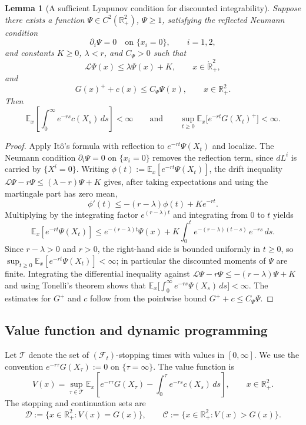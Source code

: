 \documentclass[pdflatex,sn-mathphys-num]{sn-jnl}
\theoremstyle{plain}
\newtheorem{lemma}[theorem]{Lemma}
\theoremstyle{definition}
\newcommand{\R}{\mathbb{R}}
\newcommand{\interior}[1]{\mathring{#1}}
\begin{document}
\begin{lemma}[A sufficient Lyapunov condition for discounted integrability]
\label{lem:lyapunov-integrability}
Suppose there exists a function $\Psi\in C^2(\R^2_+)$, $\Psi\ge1$, satisfying
the reflected Neumann condition
\[
   \partial_i\Psi=0
   \quad\text{on }\{x_i=0\},
   \qquad i=1,2,
\]
and constants $K\ge0$, $\lambda<r$, and $C_\Psi>0$ such that
\[
   \mathcal L\Psi(x)\le \lambda\Psi(x)+K,
   \qquad x\in\interior{\R}^2_+,
\]
and
\[
   G(x)^+ + c(x)\le C_\Psi\Psi(x),
   \qquad x\in\R^2_+.
\]
Then
\[
   \mathbb E_x\left[
      \int_0^\infty e^{-rs}c(X_s)\,ds
   \right]<\infty
   \qquad\text{and}\qquad
   \sup_{t\ge0}
   \mathbb E_x\big[e^{-rt}G(X_t)^+\big]<\infty.
\]
\end{lemma}

\begin{proof}
Apply It\^o's formula with reflection to $e^{-rt}\Psi(X_t)$ and localize. The
Neumann condition $\partial_i\Psi=0$ on $\{x_i=0\}$ removes the reflection
term, since $dL^i$ is carried by $\{X^i=0\}$. Writing
$\phi(t):=\mathbb E_x[e^{-rt}\Psi(X_t)]$, the drift inequality
$\mathcal L\Psi-r\Psi\le(\lambda-r)\Psi+K$ gives, after taking expectations
and using the martingale part has zero mean,
\[
   \phi'(t)\le-(r-\lambda)\phi(t)+K e^{-rt}.
\]
Multiplying by the integrating factor $e^{(r-\lambda)t}$ and integrating from
$0$ to $t$ yields
\[
   \mathbb E_x[e^{-rt}\Psi(X_t)]
   \le
   e^{-(r-\lambda)t}\Psi(x)
   +
   K\int_0^t e^{-(r-\lambda)(t-s)}\,e^{-rs}\,ds .
\]
Since $r-\lambda>0$ and $r>0$, the right-hand side is bounded uniformly in
$t\ge0$, so $\sup_{t\ge0}\mathbb E_x[e^{-rt}\Psi(X_t)]<\infty$; in particular
the discounted moments of $\Psi$ are finite. Integrating the differential
inequality against $\mathcal L\Psi-r\Psi\le-(r-\lambda)\Psi+K$ and using
Tonelli's theorem shows that
$\mathbb E_x\big[\int_0^\infty e^{-rs}\Psi(X_s)\,ds\big]<\infty$. The estimates
for $G^+$ and $c$ follow from the pointwise bound $G^++c\le C_\Psi\Psi$.
\end{proof}

\subsection{Value function and dynamic programming}
\label{sec:value-dpp}
Let $\mathcal T$ denote the set of $(\mathcal F_t)$-stopping times with values
in $[0,\infty]$. We use the convention
$e^{-r\tau}G(X_\tau):=0$ on $\{\tau=\infty\}$. The value function is
\begin{equation}
\label{eq:value-function}
   V(x)
   =
   \sup_{\tau\in\mathcal T}
   \mathbb E_x\left[
      e^{-r\tau}G(X_\tau)
      -
      \int_0^\tau e^{-rs}c(X_s)\,ds
   \right],
   \qquad x\in\R^2_+.
\end{equation}
The stopping and continuation sets are
\[
   \mathcal D:=\{x\in\R^2_+:V(x)=G(x)\},
   \qquad
   \mathcal C:=\{x\in\R^2_+:V(x)>G(x)\}.
\]
\end{document}
